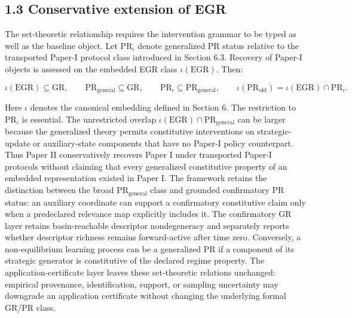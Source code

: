 \documentclass[10pt]{article}
\begin{document}
\subsection{1.3 Conservative extension of
EGR}\label{conservative-extension-of-egr}

The set-theoretic relationship requires the intervention grammar to be
typed as well as the baseline object. Let \(\mathrm{PR}_{\iota}\) denote
generalized PR status relative to the transported Paper-I protocol class
introduced in Section 6.3. Recovery of Paper-I objects is assessed on
the embedded EGR class \(\iota(\mathrm{EGR})\). Then:

\begin{equation}
\iota(\mathrm{EGR})\subseteq\mathrm{GR},\qquad \mathrm{PR}_{\mathrm{general}}\subseteq\mathrm{GR},\qquad \mathrm{PR}_{\iota}\subseteq\mathrm{PR}_{\mathrm{general}},\qquad \iota(\mathrm{PR}_{\mathrm{old}})=\iota(\mathrm{EGR})\cap\mathrm{PR}_{\iota}.
\tag{2}\label{eq:2}
\end{equation}

Here \(\iota\) denotes the canonical embedding defined in Section 6. The
restriction to \(\mathrm{PR}_{\iota}\) is essential. The unrestricted
overlap \(\iota(\mathrm{EGR})\cap{}\mathrm{PR}_{\mathrm{general}}\) can
be larger because the generalized theory permits constitutive
interventions on strategic-update or auxiliary-state components that
have no Paper-I policy counterpart. Thus Paper II conservatively
recovers Paper I under transported Paper-I protocols without claiming
that every generalized constitutive property of an embedded
representation existed in Paper I. The framework retains the distinction
between the broad \(\mathrm{PR}_{\mathrm{general}}\) class and grounded
confirmatory PR status: an auxiliary coordinate can support a
confirmatory constitutive claim only when a predeclared relevance map
explicitly includes it. The confirmatory GR layer retains
basin-reachable descriptor nondegeneracy and separately reports whether
descriptor richness remains forward-active after time zero. Conversely,
a non-equilibrium learning process can be a generalized PR if a
component of its strategic generator is constitutive of the declared
regime property. The application-certificate layer leaves these set-theoretic
relations unchanged: empirical provenance, identification, support, or
sampling uncertainty may downgrade an application certificate without
changing the underlying formal GR/PR class.
\end{document}
